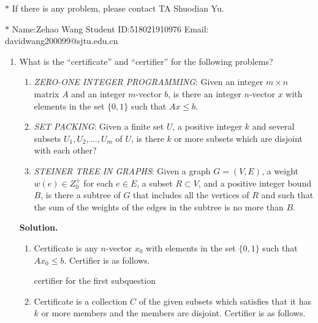 \documentclass[12pt,a4paper]{article}
\theoremstyle{definition}
\begin{document}
\noindent

\noindent{}
\begin{center}
\footnotesize{\color{red}$*$ If there is any problem, please contact TA Shuodian Yu. }

\footnotesize{\color{blue}$*$ Name:Zehao Wang  \quad Student ID:518021910976 \quad Email: davidwang200099@sjtu.edu.cn}
\end{center}
\begin{enumerate}
	\item What is the ``certificate'' and ``certifier'' for the following problems?
	\begin{enumerate}
		\item \emph{ZERO-ONE INTEGER PROGRAMMING}: Given an integer $m \times n$ matrix $A$ and an integer $m$-vector $b$, is there an integer $n$-vector $x$ with elements in the set $\{0, 1\}$ such that $Ax \leq b$.
		\item \emph{SET PACKING}: Given a finite set $U$, a positive integer $k$ and several subsets $U_1, U_2, \ldots, U_m$ of $U$, is there $k$ or more subsets which are disjoint with each other?
		\item \emph{STEINER TREE IN GRAPHS}: Given a graph $G=(V,E)$, a weight $w(e)\in Z_0^{+}$ for each $e\in E$, a subset $R \subset V$, and a positive integer bound $B$, is there a subtree of $G$ that includes all the vertices of $R$ and such that the sum of the weights of the edges in the subtree is no more than $B$.
	\end{enumerate}
	\textbf{Solution.}
        \begin{enumerate}
            \item 
                Certificate is any $n$-vector $x_0$ with elements in the set $\{0,1\}$ such that $Ax_0 \leq b$.
                Certifier is as follows.
                
                \begin{minipage}[t]{0.8\textwidth}
                \begin{algorithm}[H]
                \BlankLine
                \caption{certifier for the first subquestion}
                \label{Alg-certifier-1}
                \BlankLine
                \end{algorithm}
                \end{minipage}
            \item 
                Certificate is a collection $C$ of the given subsets which satisfies that it has $k$ or more members and the members are disjoint.
                Certifier is as follows.
                

\end{enumerate}
\end{enumerate}
\end{document}
